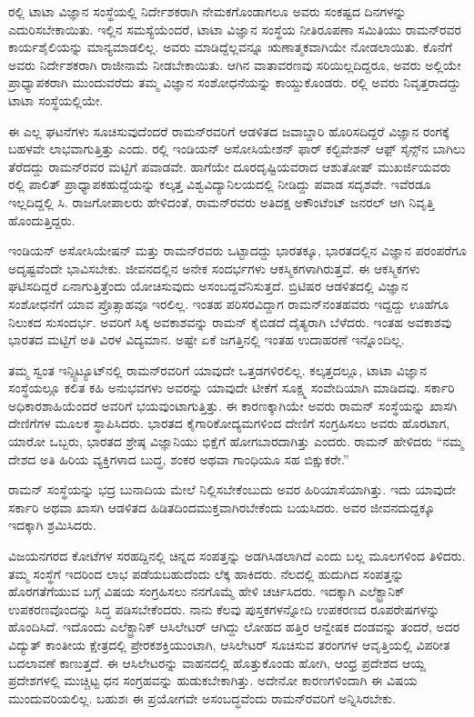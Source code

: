 ರಲ್ಲಿ ಟಾಟಾ ವಿಜ್ಞಾನ ಸಂಸ್ಥೆಯಲ್ಲಿ ನಿರ್ದೇಶಕರಾಗಿ ನೇಮಕಗೊಂಡಾಗಲೂ ಅವರು ಸಂಕಷ್ಟದ ದಿನಗಳನ್ನು ಎದುರಿಸಬೇಕಾಯಿತು. ಇಲ್ಲಿನ ಸಮಸ್ಯೆಯೆಂದರೆ, ಟಾಟಾ ವಿಜ್ಞಾನ ಸಂಸ್ಥೆಯ ನೀತಿರೂಪಣಾ ಸಮಿತಿಯು ರಾಮನ್‍ರವರ ಕಾರ್ಯಶೈಲಿಯನ್ನು ಮಾನ್ಯಮಾಡಲಿಲ್ಲ. ಅವರು ಮಾಡಿದ್ದೆಲ್ಲವನ್ನೂ ಋಣಾತ್ಮಕವಾಗಿಯೇ ನೋಡಲಾಯಿತು. ಕೊನೆಗೆ ಅವರು ನಿರ್ದೇಶಕರಾಗಿ ರಾಜೀನಾಮೆ ನೀಡಬೇಕಾಯಿತು. ಆಗಿನ ವಾತಾವರಣವು ಸರಿಯಿಲ್ಲದಿದ್ದರೂ, ಅವರು ಅಲ್ಲಿಯೇ ಪ್ರಾಧ್ಯಾಪಕರಾಗಿ ಮುಂದುವರೆದು ತಮ್ಮ ವಿಜ್ಞಾನ ಸಂಶೋಧನೆಯನ್ನು ಕಾಯ್ದುಕೊಂಡರು. ರಲ್ಲಿ ಅವರು ನಿವೃತ್ತರಾದದ್ದು ಟಾಟಾ ಸಂಸ್ಥೆಯಲ್ಲಿಯೇ.

ಈ ಎಲ್ಲ ಘಟನೆಗಳು ಸೂಚಿಸುವುದೆಂದರೆ ರಾಮನ್‍ರವರಿಗೆ ಆಡಳಿತದ ಜವಾಬ್ದಾರಿ ಹೊರಿಸದಿದ್ದರೆ ವಿಜ್ಞಾನ ರಂಗಕ್ಕೆ ಬಹಳವೇ ಲಾಭವಾಗುತ್ತಿತ್ತು ಎಂದು. ರಲ್ಲಿ ಇಂಡಿಯನ್ ಅಸೋಸಿಯೇಶನ್ ಫಾರ್ ಕಲ್ಟಿವೇಶನ್ ಆಫ಼್ ಸೈನ್ಸ್‌ನ ಬಾಗಿಲು ತೆರೆದದ್ದು ರಾಮನ್‍ರವರ ಮಟ್ಟಿಗೆ ಪವಾಡವೇ. ಹಾಗೆಯೇ ದೂರದೃಷ್ಟಿಯವರಾದ ಆಶುತೋಷ್ ಮುಖರ್ಜಿಯವರು ರಲ್ಲಿ ಪಾಲಿತ್ ಪ್ರಾಧ್ಯಾಪಕ\break ಹುದ್ದೆಯನ್ನು ಕಲ್ಕತ್ತ ವಿಶ್ವವಿದ್ಯಾನಿಲಯದಲ್ಲಿ ನೀಡಿದ್ದು ಪವಾಡ ಸದೃಶವೇ. ಇವೆರಡೂ ಇಲ್ಲದಿದ್ದಲ್ಲಿ ಸಿ. ರಾಜಗೋಪಾಲರು ಹೇಳಿದಂತೆ, ರಾಮನ್‍ರವರು ಅತಿದಕ್ಷ ಅಕೌಂಟೆಂಟ್ ಜನರಲ್ ಆಗಿ ನಿವೃತ್ತಿ ಹೊಂದುತ್ತಿದ್ದರು.

ಇಂಡಿಯನ್ ಅಸೋಸಿಯೇಷನ್ ಮತ್ತು ರಾಮನ್‍ರವರು ಒಟ್ಟಾದದ್ದು ಭಾರತಕ್ಕೂ, ಭಾರತದಲ್ಲಿನ ವಿಜ್ಞಾನ ಪರಂಪರೆಗೂ ಅದೃಷ್ಟವೆಂದೇ ಭಾವಿಸಬೇಕು. ಜೀವನದಲ್ಲಿನ ಅನೇಕ ಸಂದರ್ಭಗಳು ಆಕಸ್ಮಿಕಗಳಾಗಿರುತ್ತವೆ. ಈ ಆಕಸ್ಮಿಕಗಳು ಘಟಿಸದಿದ್ದರೆ ಏನಾಗುತ್ತಿತ್ತೆಂದು ಯೋಚಿಸುವುದು ಅಸಂಬದ್ದ\-ವೆನಿಸುತ್ತದೆ. ಬ್ರಿಟಿಷರ ಆಡಳಿತದಲ್ಲಿ ವಿಜ್ಞಾನ ಸಂಶೋಧನೆಗೆ ಯಾವ ಪ್ರೊತ್ಸಾಹವೂ ಇರಲಿಲ್ಲ. ಇಂತಹ ಪರಿಸರವಿದ್ದಾಗ ರಾಮನ್‌ನಂತಹವರು ಇದ್ದದ್ದು ಊಹೆಗೂ ನಿಲುಕದ ಸುಸಂದರ್ಭ. ಅವರಿಗೆ ಸಿಕ್ಕ ಅವಕಾಶವನ್ನು ರಾಮನ್ ಕೈಬಿಡದೆ ದೈತ್ಯರಾಗಿ ಬೆಳೆದರು. ಇಂತಹ ಅವಕಾಶವು ಭಾರತದ ಮಟ್ಟಿಗೆ ಅತಿ ವಿರಳ ವಿದ್ಯಮಾನ. ಅಷ್ಟೇ ಏಕೆ ಜಗತ್ತಿನಲ್ಲಿ ಇಂತಹ ಉದಾಹರಣೆ ಇನ್ನೊಂದಿಲ್ಲ.

ತಮ್ಮ ಸ್ವಂತ ಇನ್ಸ್ಟಿಟ್ಯೂಟ್‍ನಲ್ಲಿ ರಾಮನ್‍ರವರಿಗೆ ಯಾವುದೇ ಒತ್ತಡಗಳಿರಲಿಲ್ಲ. ಕಲ್ಕತ್ತದಲ್ಲೂ, ಟಾಟಾ ವಿಜ್ಞಾನ ಸಂಸ್ಥೆಯಲ್ಲೂ ಕಲಿತ ಕಹಿ ಅನುಭವಗಳು ಅವರನ್ನು ಯಾವುದೇ ಟೀಕೆಗೆ ಸೂಕ್ಷ್ಮ ಸಂವೇದಿಯಾಗಿ ಮಾಡಿದವು. ಸರ್ಕಾರಿ ಅಧಿಕಾರಶಾಹಿಯೆಂದರೆ ಅವರಿಗೆ ಭಯವುಂಟಾಗುತ್ತಿತ್ತು. ಈ ಕಾರಣಕ್ಕಾಗಿಯೇ ಅವರು ರಾಮನ್ ಸಂಸ್ಥೆಯನ್ನು ಖಾಸಗಿ ದೇಣಿಗೆಗಳ ಮೂಲಕ ಸ್ಥಾಪಿಸಿದರು. ಭಾರತದ ಕೈಗಾರಿಕೋದ್ಯಮಗಳಿಂದ ದೇಣಿಗೆ ಸಂಗ್ರಹಿಸಲು ಅವರು ಹೊರಟಾಗ, ಯಾರೋ ಒಬ್ಬರು, ಭಾರತದ ಶ್ರೇಷ್ಠ ವಿಜ್ಞಾನಿಯು ಭಿಕ್ಷೆಗೆ ಹೋಗಬಾರದಾಗಿತ್ತು ಎಂದರು. ರಾಮನ್ ಹೇಳಿದರು\enginline{--} “ನಮ್ಮ ದೇಶದ ಅತಿ ಹಿರಿಯ ವ್ಯಕ್ತಿಗಳಾದ ಬುದ್ಧ, ಶಂಕರ ಅಥವಾ ಗಾಂಧಿಯೂ ಸಹ ಬಿಕ್ಷುಕರೇ.”

\vskip 2pt

ರಾಮನ್ ಸಂಸ್ಥೆಯನ್ನು ಭದ್ರ ಬುನಾದಿಯ ಮೇಲೆ ನಿಲ್ಲಿಸಬೇಕೆಂಬುದು ಅವರ ಹಿರಿಯಾಸೆ\-ಯಾಗಿತ್ತು. ಇದು ಯಾವುದೇ ಸರ್ಕಾರಿ ಅಥವಾ ಖಾಸಗಿ ಆಡಳಿತದ ಹಿಡಿತದಿಂದ\break ಮುಕ್ತವಾಗಿರಬೇಕೆಂದು ಬಯಸಿದರು. ಅವರ ಜೀವನದುದ್ದಕ್ಕೂ ಇದಕ್ಕಾಗಿ ಶ್ರಮಿಸಿದರು.

\vskip 2pt

ವಿಜಯನಗರದ ಕೋಟೆಗಳ ಸರಹದ್ದಿನಲ್ಲಿ ಚಿನ್ನದ ಸಂಪತ್ತನ್ನು ಅಡಗಿಸಿಡಲಾಗಿದೆ ಎಂದು ಬಲ್ಲ ಮೂಲಗಳಿಂದ ತಿಳಿದರು. ತಮ್ಮ ಸಂಸ್ಥೆಗೆ ಇದರಿಂದ ಲಾಭ ಪಡೆಯಬಹುದೆಂದು ಲೆಕ್ಕ ಹಾಕಿದರು. ನೆಲದಲ್ಲಿ ಹುದುಗಿದ ಸಂಪತ್ತನ್ನು ಹೊರಗತೆಗೆಯುವ ಬಗ್ಗೆ ವಿಷಯ ಸಂಗ್ರಹಿಸಲು ನನಗೊಮ್ಮೆ ಹೇಳಿ ಚರ್ಚಿಸಿದರು. ಇದಕ್ಕಾಗಿ ಎಲೆಕ್ಟ್ರಾನಿಕ್ ಉಪಕರಣವೊಂದನ್ನು ಸಿದ್ಧ ಪಡಿಸಬೇಕೆಂದರು. ನಾನು ಕೆಲವು ಪುಸ್ತಕಗಳನ್ನೋದಿ ಉಪಕರಣದ ರೂಪರೇಷಗಳನ್ನು ಹೊಂದಿಸಿದೆ. ಇದೊಂದು ಎಲೆಕ್ಟ್ರಾನಿಕ್ ಆಸಿಲೇಟರ್ ಆಗಿದ್ದು ಲೋಹದ ಹತ್ತಿರ ಆನ್ವೇಷಕ ದಂಡವನ್ನು ತಂದರೆ, ಅದರ ವಿದ್ಯುತ್ ಕಾಂತೀಯ ಕ್ಷೇತ್ರದಲ್ಲಿ ಪ್ರೇರಕಶಕ್ತಿಯುಂಟಾಗಿ, ಆಸಿಲೇಟರ್ ಸೂಚಿಸುವ ತರಂಗಗಳ ಆವೃತ್ತಿಯಲ್ಲಿ ವಿಪರೀತ ಬದಲಾವಣೆ ಕಾಣುತ್ತದೆ. ಈ ಆಸಿಲೇಟರನ್ನು ವಾಹನದಲ್ಲಿ ಹೊತ್ತುಕೊಂಡು ಹೋಗಿ, ಆಂಧ್ರ ಪ್ರದೇಶದ ಆಯ್ದ ಪ್ರದೇಶಗಳಲ್ಲಿ ಮುಚ್ಚಿಟ್ಟ ಧನ ಸಂಗ್ರಹವನ್ನು ಹುಡುಕಬೇಕಾಗಿತ್ತು. ಅದೇನೋ ಕಾರಣಗಳಿಂದಾಗಿ ಈ ವಿಷಯ ಮುಂದುವರಿಯಲಿಲ್ಲ. ಬಹುಶಃ ಈ ಪ್ರಯೋಗವೇ ಅಸಂಬದ್ಧವೆಂದು ರಾಮನ್‍ರವರಿಗೆ ಅನ್ನಿಸಿರಬೇಕು.

